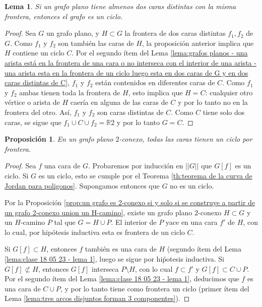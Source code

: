 \documentclass[12pt]{report}
\theoremstyle{plain}
\newtheorem{lemma}[theorem]{Lema}
\newtheorem{proposition}[theorem]{Proposición}
\theoremstyle{definition}
\newcommand{\reals}{\mathbb{R}}
\newcommand{\Abs}[1]{\left \vert \left \vert #1 \right \vert \right \vert}
\begin{document}
\begin{lemma}
Si un grafo plano tiene almenos dos caras distintas con la misma frontera, entonces el grafo es un ciclo.
\end{lemma}
\begin{proof}
Sea $G$ un grafo plano, y $H \subset G$ la frontera de dos caras distintas $f_1, f_2$ de $G$. Como $f_1$ y $f_2$ son también las caras de $H$, la proposición anterior implica que $H$ contiene un ciclo $C$. Por el segundo ítem del Lema \ref{lema:grafos planos - una arista está en la frontera de una cara o no interseca con el interior de una arista - una arista esta en la frontera de un ciclo luego esta en dos caras de G y en dos caras distintas de C}, $f_1$ y $f_2$ están contenidos en diferentes caras de $C$. Como $f_1$ y $f_2$ ambas tienen toda la frontera de $H$, esto implica que $H = C$: cualquier otro vértice o arista de $H$ caería en alguna de las caras de $C$ y por lo tanto no en la frontera del otro. Así, $f_1$ y $f_2$ son caras distintas de $C$. Como $C$ tiene solo dos caras, se sigue que $f_1 \cup C \cup f_2 = \reals 2$ y por lo tanto $G = C$.
\end{proof}

\begin{proposition}
En un grafo plano $2$-conexo, todas las caras tienen un ciclo por frontera.
\end{proposition}
\begin{proof}
Sea $f$ una cara de $G$. Probaremos por inducción en $\Abs G$ que $G[f]$ es un ciclo. Si $G$ es un ciclo, esto se cumple por el Teorema \ref{th:teorema de la curva de Jordan para poligonos}. Supongamos entonces que $G$ no es un ciclo.

Por la Proposición \ref{prop:un grafo es 2-conexo si y solo si se construye a partir de un grafo 2-conexo union un H-camino}, existe un grafo plano $2$-conexo $H \subset G$ y un $H$-camino $P$ tal que $G = H \cup P$. El interior de $P$ yace en una cara $f'$ de $H$, con lo cual, por hipótesis inductiva esta es frontera de un ciclo $C$.

Si $G[f] \subset H$, entonces $f$ también es una cara de $H$ (segundo ítem del Lema \ref{lema:clase 18 05 23 - lema 1}, luego se sigue por hiṕotesis inductiva. Si $G[f] \not \subset H$, entonces $G[f]$ interseca $P \setminus H$, con lo cual $f \subset f'$ y $G[f] \subset C \cup P$. Por el segundo ítem del Lema \ref{lema:clase 18 05 23 - lema 1}, deducimos que $f$ es una cara de $C \cup P$, y por lo tanto tiene como frontera un ciclo (primer ítem del Lema \ref{lema:tres arcos disjuntos forman 3 componentes}).
\end{proof}
\end{document}
